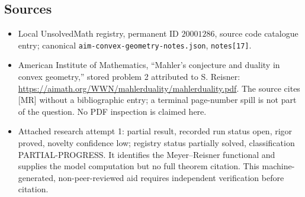 \documentclass[11pt]{article}
\begin{document}
\subsection{Sources}
\begin{itemize}
\item Local UnsolvedMath registry, permanent ID $20001286$, source code catalogue entry; canonical \texttt{aim-convex-geometry-notes.json}, \texttt{notes[17]}.
\item American Institute of Mathematics, ``Mahler's conjecture and duality in convex geometry,'' stored problem 2 attributed to S. Reisner: \url{https://aimath.org/WWN/mahlerduality/mahlerduality.pdf}. The source cites [MR] without a bibliographic entry; a terminal page-number spill is not part of the question. No PDF inspection is claimed here.
\item Attached research attempt 1: partial result, recorded run status open, rigor proved, novelty confidence low; registry status partially solved, classification PARTIAL-PROGRESS. It identifies the Meyer--Reisner functional and supplies the model computation but no full theorem citation. This machine-generated, non-peer-reviewed aid requires independent verification before citation.
\end{itemize}
\end{document}
